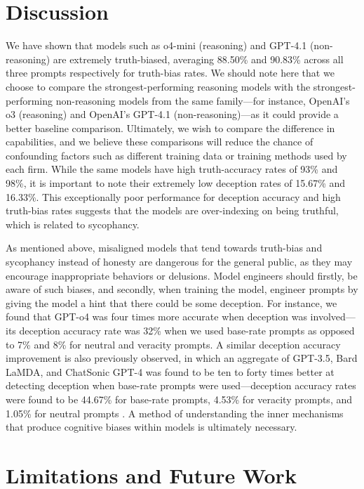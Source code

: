 \documentclass{article}
\begin{document}
\section{Discussion}
\label{sec:discussion}

We have shown that models such as o4-mini (reasoning) and GPT-4.1 (non-reasoning) are extremely truth-biased, averaging 88.50\% and 90.83\% across all three prompts respectively for truth-bias rates. We should note here that we choose to compare the strongest-performing reasoning models with the strongest-performing non-reasoning models from the same family---for instance, OpenAI's o3 (reasoning) and OpenAI's GPT-4.1 (non-reasoning)---as it could provide a better baseline comparison. Ultimately, we wish to compare the difference in capabilities, and we believe these comparisons will reduce the chance of confounding factors such as different training data or training methods used by each firm. While the same models have high truth-accuracy rates of 93\% and 98\%, it is important to note their extremely low deception rates of 15.67\% and 16.33\%. This exceptionally poor performance for deception accuracy and high truth-bias rates suggests that the models are over-indexing on being truthful, which is related to sycophancy.

As mentioned above, misaligned models that tend towards truth-bias and sycophancy instead of honesty are dangerous for the general public, as they may encourage inappropriate behaviors or delusions. Model engineers should firstly, be aware of such biases, and secondly, when training the model, engineer prompts by giving the model a hint that there could be some deception. For instance, we found that GPT-o4 was four times more accurate when deception was involved---its deception accuracy rate was 32\% when we used base-rate prompts as opposed to 7\% and 8\% for neutral and veracity prompts. A similar deception accuracy improvement is also previously observed, in which an aggregate of GPT-3.5, Bard LaMDA, and ChatSonic GPT-4 was found to be ten to forty times better at detecting deception when base-rate prompts were used---deception accuracy rates were found to be 44.67\% for base-rate prompts, 4.53\% for veracity prompts, and 1.05\% for neutral prompts \citep{markowitz_generative_2024}. A method of understanding the inner mechanisms that produce cognitive biases within models is ultimately necessary.

\section{Limitations and Future Work}
\label{sec:limitations}
\end{document}
